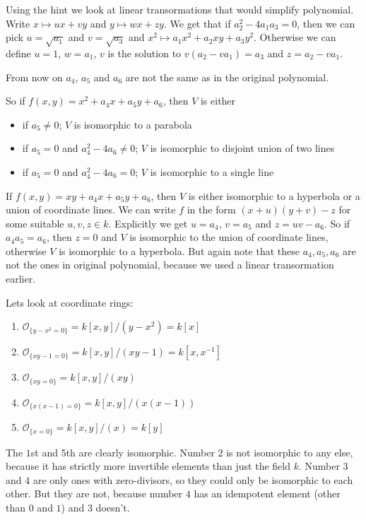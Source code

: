 \begin{exercise}{3}
    Using the hint we look at linear transormations that would simplify
    polynomial. Write $x \mapsto ux + vy$ and $y \mapsto wx + zy$. We get that
    if $a^2_2 - 4 a_1 a_3 = 0$, then we can pick $u = \sqrt{a_1}$ and $v =
    \sqrt{a_3}$ and $x^2 \mapsto a_1 x^2 + a_2 xy + a_3 y^2$. Otherwise we can
    define $u = 1$, $w = a_1$, $v$ is the solution to $v(a_2 - v a_1) = a_3$ and
    $z = a_2 - v a_1$.

    From now on $a_4$, $a_5$ and $a_6$ are not the same as in the original
    polynomial.

    So if $f(x, y) = x^2 + a_4 x + a_5 y + a_6$, then $V$ is either
    \begin{itemize}
        \item if $a_5 \not= 0$; $V$ is isomorphic to a parabola
        \item if $a_5 = 0$ and $a^2_4 - 4 a_6 \not= 0$; $V$ is isomorphic to disjoint union of two lines
        \item if $a_5 = 0$ and $a^2_4 - 4 a_6 = 0$; $V$ is isomorphic to a single line
    \end{itemize}

    If $f(x, y) = xy + a_4 x + a_5 y + a_6$, then $V$ is either isomorphic to a
    hyperbola or a union of coordinate lines. We can write $f$ in the form $(x +
    u) (y + v) - z$ for some suitable $u, v, z \in k$. Explicitly we get $u =
    a_4$, $v = a_5$ and $z = uv - a_6$. So if $a_4 a_5 = a_6$, then $z = 0$ and
    $V$ is isomorphic to the union of coordinate lines, otherwise $V$ is
    isomorphic to a hyperbola. But again note that these $a_4, a_5, a_6$ are not
    the ones in original polynomial, because we used a linear transormation
    earlier.
\end{exercise}

\begin{exercise}{4}
    Lets look at coordinate rings:
    \begin{enumerate}
        \item $\mathcal{O}_{\{y - x^2 = 0\}} = k[x, y] / (y - x^2) = k[x]$
        \item $\mathcal{O}_{\{xy - 1 = 0\}} = k[x, y] / (xy - 1) = k[x, x^{-1}]$
        \item $\mathcal{O}_{\{xy = 0\}} = k[x, y] / (xy)$
        \item $\mathcal{O}_{\{x(x - 1) = 0\}} = k[x, y] / (x(x - 1))$
        \item $\mathcal{O}_{\{x = 0\}} = k[x, y] / (x) = k[y]$
    \end{enumerate}
    The $1$st and $5$th are clearly isomorphic. Number $2$ is not isomorphic to
    any else, because it has strictly more invertible elements than just the
    field $k$. Number $3$ and $4$ are only ones with zero-divisors, so they
    could only be isomorphic to each other. But they are not, because number $4$
    has an idempotent element (other than $0$ and $1$) and $3$ doesn't.
\end{exercise}


